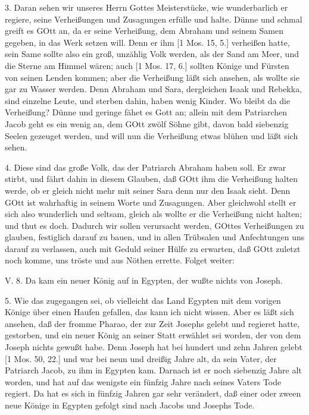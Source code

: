 3. Daran sehen wir unseres Herrn Gottes Meisterstücke, wie wunderbarlich er regiere, seine Verheißungen und Zusagungen erfülle und halte. Dünne und schmal greift es GOtt an, da er seine Verheißung, dem Abraham und seinem Samen gegeben, in das Werk setzen will. Denn er ihm [1 Mos. 15, 5.] verheißen hatte, sein Same sollte also ein groß, unzählig Volk werden, als der Sand am Meer, und die Sterne am Himmel wären; auch [1 Mos. 17, 6.] sollten Könige und Fürsten von seinen Lenden kommen; aber die Verheißung läßt sich ansehen, als wollte sie gar zu Wasser werden. Denn Abraham und Sara, dergleichen Isaak und Rebekka, sind einzelne Leute, und sterben dahin, haben wenig Kinder. Wo bleibt da die Verheißung? Dünne und geringe fähet es Gott an; allein mit dem Patriarchen Jacob geht es ein wenig an, dem GOtt zwölf Söhne gibt, davon bald siebenzig Seelen gezeuget werden, und will nun die Verheißung etwas blühen und läßt sich sehen.

4. Diese sind das große Volk, das der Patriarch Abraham haben soll. Er zwar stirbt, und fährt dahin in diesem Glauben, daß GOtt ihm die Verheißung halten werde, ob er gleich nicht mehr mit seiner Sara denn nur den Isaak sieht. Denn GOtt ist wahrhaftig in seinem Worte und Zusagungen. Aber gleichwohl stellt er sich also wunderlich und seltsam, gleich als wollte er die Verheißung nicht halten; und thut es doch. Dadurch wir sollen verursacht werden, GOttes Verheißungen zu glauben, festiglich darauf zu bauen, und in allen Trübsalen und Anfechtungen uns darauf zu verlassen, auch mit Geduld seiner Hülfe zu erwarten, daß GOtt zuletzt noch komme, uns tröste und aus Nöthen errette. Folget weiter:

\begin{schriftzitat}
V. 8. Da kam ein neuer König auf in Egypten, der wußte nichts von Joseph.
\end{schriftzitat}

5. Wie das zugegangen sei, ob vielleicht das Land Egypten mit dem vorigen Könige über einen Haufen gefallen, das kann ich nicht wissen. Aber es läßt sich ansehen, daß der fromme Pharao, der zur Zeit Josephs gelebt und regieret hatte, gestorben, und ein neuer König an seiner Statt erwählet sei worden, der von dem Joseph nichts gewußt habe. Denn Joseph hat bei hundert und zehn Jahren gelebt [1 Mos. 50, 22.] und war bei neun und dreißig Jahre alt, da sein Vater, der Patriarch Jacob, zu ihm in Egypten kam. Darnach ist er noch siebenzig Jahre alt worden, und hat auf das wenigste ein fünfzig Jahre nach seines Vaters Tode regiert. Da hat es sich in fünfzig Jahren gar sehr verändert, daß einer oder zween neue Könige in Egypten gefolgt sind nach Jacobs und Josephs Tode.

